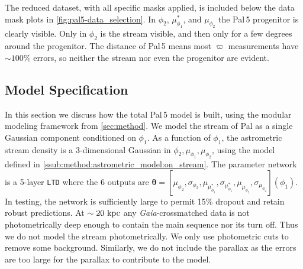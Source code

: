 \documentclass[twocolumn]{aastex631}
\newcommand{\stream}[1]{#1}
\newcommand{\dataarchive}[1]{\textit{#1}}
\newcommand{\Gaia}{\dataarchive{Gaia}}
\newcommand{\mbs}[1]{\boldsymbol{#1}}
\newcommand{\parallax}{\varpi}
\begin{document}
        The reduced dataset, with all specific masks applied, is included below
        the data mask plots in \autoref{fig:pal5-data_selection}. In $\phi_2$,
        $\mu_{\phi_1}^*$, and $\mu_{\phi_2}$ the \stream{Pal\,5} progenitor is
        clearly visible. Only in $\phi_2$ is the stream visible, and then only
        for a few degrees around the progenitor. The distance of \stream{Pal\,5}
        means most $\parallax$ measurements have $\sim 100\%$ errors, so neither
        the stream nor even the progenitor are evident.
        


    \vspace{-6pt}
    \subsection{Model Specification} \label{sub:results_pal5:model}

        In this section we discuss how the total \stream{Pal\,5} model is built,
        using the modular modeling framework from \autoref{sec:method}.  We
        model the stream of \stream{Pal} as a single Gaussian component
        conditioned on $\phi_1$. As a function of $\phi_1$, the astrometric
        stream density is a 3-dimensional Gaussian in $\phi_2, \mu_{\phi_1},
        \mu_{\phi_2}$, using the model defined in
        \autoref{ssub:method:astrometric_model:on_stream}.  The parameter
        network is a 5-layer \texttt{LTD} where the 6 outputs are $\mbs{\theta}
        = [\mu_{\phi_2}, \sigma_{\phi_2}, \mu_{\mu_{\phi_1}^*},
        \sigma_{\mu_{\phi_1}^*}, \mu_{\mu_{\phi_2}},
        \sigma_{\mu_{\phi_2}}](\phi_1)$.  In testing, the network is
        sufficiently large to permit 15\% dropout and retain robust predictions.
        At $\sim 20 \ \rm{kpc}$ any \Gaia{}-crossmatched data is not
        photometrically deep enough to contain the main sequence nor its turn
        off. Thus we do not model the stream photometrically. We only use
        photometric cuts to remove some background. Similarly, we do not include
        the parallax as the errors are too large for the parallax to contribute
        to the model. 
\end{document}
